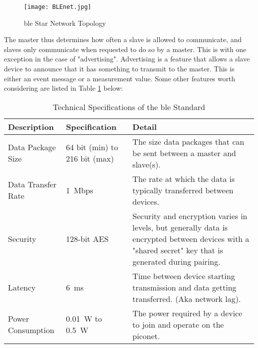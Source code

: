 \begin{figure}[H]
	\begin{center}
		\texttt{[image: BLEnet.jpg]}
		\caption{\ac{ble} Star Network Topology}
		\label{fig:ble}
	\end{center}
\end{figure}

The master thus determines how often a slave is allowed to communicate, and slaves only communicate when requested to do so by a master. This is with one exception in the case of "advertising". Advertising is a feature that allows a slave device to announce that it has something to transmit to the master. This is either an event message or a measurement value.
\newpage
Some other features worth considering are listed in Table \ref{tab:ble} below:
\begin{table}[H]
	\renewcommand{\arraystretch}{1.5}
	\centering
	\caption{Technical Specifications of the \ac{ble} Standard}
	\begin{tabularx}{\textwidth}{>{\raggedright}p{2.5cm} >{\raggedright}p{3cm} >{\raggedright\arraybackslash}X}
		\toprule
		Description        & Specification                       & Detail                                                                                                                                                 \\
		\midrule
		Data Package Size  & 64 bit (min) to 216 bit (max)       & The size data packages that can be sent between a master and slave(s).                                                                                 \\
		Data Transfer Rate & \SI{1}{Mbps}                        & The rate at which the data is typically transferred between devices.                                                                                   \\
		Security           & 128-bit AES                         & Security and encryption varies in levels, but generally data is encrypted between devices with a "shared secret" key that is generated during pairing. \\
		Latency            & \SI{6}{\milli\second}               & Time between device starting transmission and data getting transferred. (Aka network lag).                                                             \\
		Power Consumption  & \SI{0.01}{\watt} to \SI{0.5}{\watt} & The power required by a device to join and operate on the piconet.                                                                                     \\
		\bottomrule
	\end{tabularx}
	\label{tab:ble}
\end{table}


